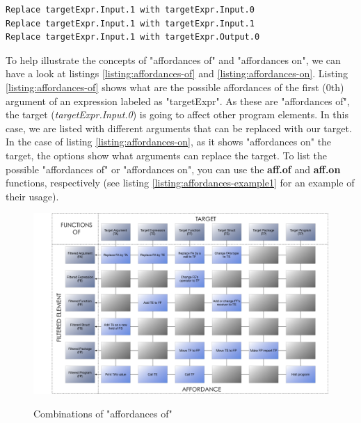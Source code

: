 \documentclass[11pt,fleqn,openany]{book} %
\begin{document}
\begin{lstlisting}[caption={A list of "affordances on" an argument},captionpos=b,label={listing:affordances-on}]
Replace targetExpr.Input.1 with targetExpr.Input.0
Replace targetExpr.Input.1 with targetExpr.Input.1
Replace targetExpr.Input.1 with targetExpr.Output.0
\end{lstlisting}

To help illustrate the concepts of "affordances of" and "affordances on", we can have a look at listings \ref{listing:affordances-of} and \ref{listing:affordances-on}. Listing \ref{listing:affordances-of} shows what are the possible affordances of the first (0th) argument of an expression labeled as "targetExpr". As these are "affordances of", the target (\textit{targetExpr.Input.0}) is going to affect other program elements. In this case, we are listed with different arguments that can be replaced with our target. In the case of listing \ref{listing:affordances-on}, as it shows "affordances on" the target, the options show what arguments can replace the target. To list the possible "affordances of" or "affordances on", you can use the \textbf{aff.of} and \textbf{aff.on} functions, respectively (see listing \ref{listing:affordances-example1} for an example of their usage).

\begin{figure}
\caption{Combinations of "affordances of"}
\centering
\includegraphics[width=1.0\textwidth]{img/functions-of.png}
\label{figure:combinations-of-affordances-of}
\end{figure}
\end{document}
